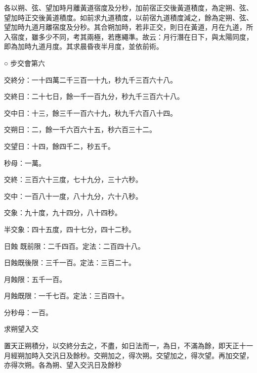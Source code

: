 \begin{pinyinscope}
 各以朔、弦、望加時月離黃道宿度及分秒，加前宿正交後黃道積度，為定朔、弦、望加時正交後黃道積度。如前求九道積度，以前宿九道積度減之，餘為定朔、弦、望加時九道月離宿度及分秒。其合朔加時，若非正交，則日在黃道，月在九道，所入宿度，雖多少不同，考其兩極，若應繩準。故云：月行潛在日下，與太陽同度，即為加時九道月度。其求晨昏夜半月度，並依前術。



 ○
 步交會第六



 交終分：一十四萬二千三百一十九，秒九千三百六十八。



 交終日：二十七日，餘一千一百九分，秒九千三百六十八。



 交中日：十三，餘三千一百六十九，秋九千六百八十四。



 交朔日：二，餘一千六百六十五，秒六百三十二。



 交望日：十四，餘四千二，秒五千。



 秒母：一萬。



 交終：三百六十三度，七十九分，三十六秒。



 交中：一百八十一度，八十九分，六十八秒。



 交象：九十度，九十四分，八十四秒。



 半交象：四十五度，四十七分，四十二秒。



 日蝕
 既前限：二千四百。定法：二百四十八。



 日蝕既後限：三千一百。定法：三百二十。



 月蝕限：五千一百。



 月蝕既限：一千七百。定法：三百四十。



 分秒母：一百。



 求朔望入交



 置天正朔積分，以交終分去之，不盡，如日法而一，為日，不滿為餘，即天正十一月經朔加時入交汎日及餘秒。交朔加之，得次朔。交望加之，得次望。再加交望，亦得次朔。各為朔、望入交汎日及餘秒




\end{pinyinscope}
